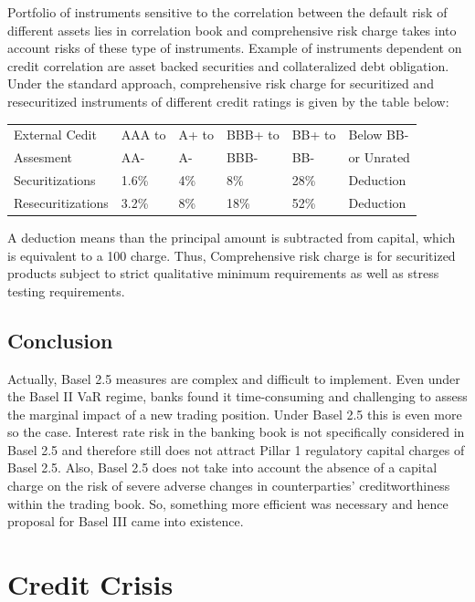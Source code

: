 \documentclass[11pt]{article}
\numberwithin{equation}{section}
\begin{document}
Portfolio of instruments sensitive to the correlation between the default risk of different assets lies in correlation book and comprehensive risk charge takes into account risks of these type of instruments. Example of instruments dependent on credit correlation are asset backed securities and collateralized debt obligation. Under the standard approach, comprehensive risk charge for securitized and resecuritized instruments of different credit ratings is given by the table below:\medskip
\begin{center}
\begin{tabular}{|p{3cm}|p{1.5cm}|p{1.5cm}|p{2cm}|p{1.5cm}|p{2.5cm}|} \hline
External Cedit & AAA to  & A+ to & BBB+ to & BB+ to & Below BB- \\ 
 Assesment & AA- &  A- &  BBB- &  BB- &  or Unrated \\ \hline
 Securitizations & 1.6\% & 4\% & 8\% & 28\% & Deduction \\
 Resecuritizations & 3.2\% & 8\% & 18\% & 52\%  & Deduction \\ \hline
 \end{tabular}
 \end{center}
 \medskip
A deduction means than the principal amount is subtracted from capital, which is equivalent to a 100%
charge. Thus, Comprehensive risk charge is for securitized products subject to strict qualitative minimum requirements as well as stress testing requirements.


\subsection{Conclusion}
\medskip
Actually, Basel 2.5 measures are complex and difficult to implement. Even under the Basel II VaR regime, banks found it time-consuming and challenging to assess the marginal impact of a new trading position. Under Basel 2.5 this is even more so the case. Interest rate risk in the banking book is not specifically considered in Basel 2.5 and therefore still does not attract Pillar 1 regulatory capital charges of Basel 2.5. Also, Basel 2.5 does not take into account the absence of a capital charge on the risk of severe adverse changes in counterparties' creditworthiness within the trading book. So, something more efficient was necessary and hence proposal for Basel III came into existence. 

\pagebreak

\section{Credit Crisis}
\end{document}
